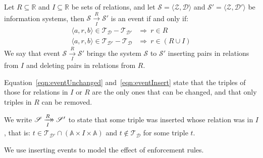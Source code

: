 \documentclass[runningheads]{llncs}
\newcommand{\xrightarrowdbl}[2][]{%
  \xrightarrow[#1]{#2}\mathrel{\mkern-14mu}\rightarrow
}
\newcommand{\pair}[2]{\langle{#1},{#2}\rangle}
\newcommand{\triple}[3]{\langle{#1},{#2},{#3}\rangle}
\newcommand{\Atoms}{\mathbb{A}}
\newcommand{\Rels}{\mathbb{R}}   %
\newcommand{\triples}{\mathcal{T}}
\newcommand{\Triple}[3]{#1\times#2\times#3}
\newcommand{\dataset}{\mathscr{D}}
\newcommand{\schema}{\mathscr{Z}}
\newcommand{\infsys}{\mathscr{S}}
\begin{document}
\begin{definition}[Event]
   Let $R \subseteq \Rels$ and $I \subseteq \Rels$ be sets of relations,
   and let $\infsys=\pair{\schema}{\dataset}$ and  $\infsys'=\pair{\schema}{\dataset'}$ be information systems,
   then $\infsys\xrightarrow[I]{R} \infsys'$ is an event if and only if:
   \begin{align}
      \triple{a}{r}{b}\in\triples_{\dataset}-\triples_{\dataset'}&\Rightarrow\ r\in R
   \label{eqn:eventUnchanged}\\
      \triple{a}{r}{b}\in\triples_{\dataset'}-\triples_{\dataset}&\Rightarrow\ r\in(R \cup I)
   \label{eqn:eventInsert}
   \end{align}
   We say that event $\infsys\xrightarrow[I]{R} \infsys'$ brings the system $\infsys$ to $\infsys'$ inserting pairs in relations from $I$ and deleting pairs in relations from $R$.
\end{definition}
   
   Equation~\ref{eqn:eventUnchanged} and~\ref{eqn:eventInsert} state that the triples of those for relations in $I$ or $R$ are the only ones that can be changed, and that only triples in $R$ can be removed.
   
\begin{definition}
   We write $\infsys \xrightarrowdbl[I]{R} \infsys'$ to state that some triple was inserted whose relation was in $I$, that is:
   $t \in \triples_{\dataset'} \cap (\Triple{\Atoms}{I}{\Atoms})$ and $t \not\in \triples_{\dataset}$ for some triple $t$.
\end{definition}
   
   We use inserting events to model the effect of enforcement rules.
\end{document}
